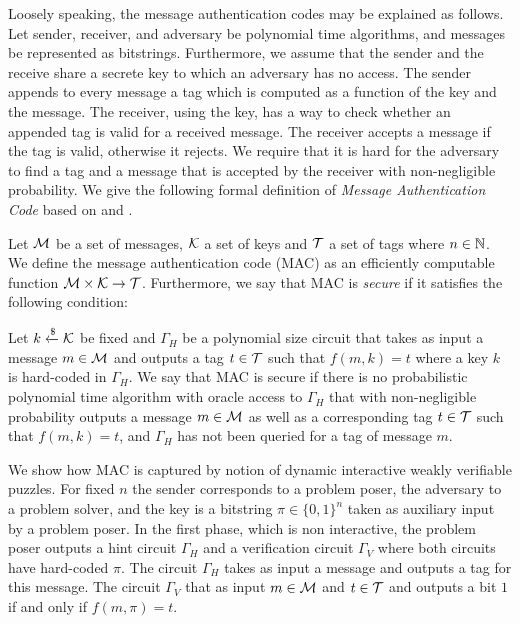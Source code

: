 Loosely speaking, the message authentication codes may be explained as follows.
Let sender, receiver, and adversary be polynomial time algorithms, and messages be represented as bitstrings.
Furthermore, we assume that the sender and the receive share a secrete key to which an adversary has no access.
The sender appends to every message a tag which is computed as a function of the key and the message.
The receiver, using the key, has a way to check whether an appended tag is valid for a received message.
The receiver accepts a message if the tag is valid, otherwise it rejects.
We require that it is hard for the adversary to find a tag and a message that is accepted by the receiver with non-negligible probability.
We give the following formal definition of \textit{Message Authentication Code} based on \cite{LectureNotesCrypo} and \cite{Goldreich:2004:FCV:975541}.
\begin{definition}
  Let $\mathcal{M}$ be a set of messages, $\mathcal{K}$ a set of keys and $\mathcal{T}$ a set of tags where $n \in \mathbb{N}$.
  We define the \textnormal{message authentication code (MAC)} as an efficiently computable function $\mathcal{M} \times \mathcal{K} \rightarrow \mathcal{T}$.
  Furthermore, we say that MAC is \textit{secure} if it satisfies the following condition:

  Let $k \xleftarrow{\$} \mathcal{K}$ be fixed and $\Gamma_H$ be a polynomial size circuit that takes as input a message $m \in \mathcal{M}$ and outputs a tag $t \in \mathcal{T}$
  such that $f(m,k) = t$ where a key $k$ is hard-coded in $\Gamma_H$. We say that MAC is secure if there is no probabilistic polynomial time algorithm
  with oracle access to $\Gamma_H$ that with non-negligible probability outputs a message $m \in \mathcal{M}$
  as well as a corresponding tag $t \in \mathcal{T}$ such that $f(m, k) = t$, and $\Gamma_H$ has not been queried for a tag of message $m$.
\end{definition}
%
We show how MAC is captured by notion of dynamic interactive weakly verifiable puzzles.
For fixed $n$ the sender corresponds to a problem poser, the adversary to a problem solver, and
the key is a bitstring $\pi \in \{0,1\}^{n}$ taken as auxiliary input by a problem poser.
In the first phase, which is non interactive, the problem poser outputs a hint circuit
$\Gamma_H$  and a verification circuit $\Gamma_V$ where both circuits have hard-coded $\pi$.
The circuit $\Gamma_H$ takes as input a message and outputs a tag for this message.
The circuit $\Gamma_V$ that as input $m \in \mathcal{M}$ and $t \in \mathcal{T}$ and outputs a bit $1$ if and only if $f(m, \pi) = t$.

